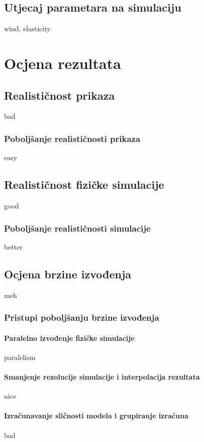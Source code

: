 \documentclass[times, utf8, diplomski]{fer}
\begin{document}
\section{Utjecaj parametara na simulaciju}
wind, elasticity

\chapter{Ocjena rezultata}
\section{Realističnost prikaza}
bad
\subsection{Poboljšanje realističnosti prikaza}
easy

\section{Realističnost fizičke simulacije}
good

\subsection{Poboljšanje realističnosti simulacije}
better

\section{Ocjena brzine izvođenja}
meh

\subsection{Pristupi poboljšanju brzine izvođenja}
\subsubsection{Paralelno izvođenje fizičke simulacije}
paralelism

\subsubsection{Smanjenje rezolucije simulacije i interpolacija rezultata}
nice

\subsubsection{Izračunavanje sličnosti modela i grupiranje izračuna}
bad
\end{document}
